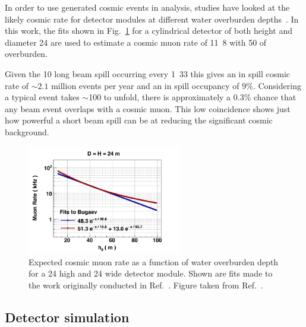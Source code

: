 In order to use generated cosmic events in analysis, studies have looked at the likely cosmic rate
for \chips detector modules at different water overburden depths~\cite{son2013}. In this work, the
fits shown in Fig.~\ref{fig:cosmic_rate} for a cylindrical detector of both height and diameter
\unit{24}{} are used to estimate a \chipsfive cosmic muon rate of
\unit{11.8}{} with \unit{50}{} of overburden.

Given the \unit{10}{\mu{}} long \numi beam spill occurring every \unit{1.33}{}
this gives an in spill cosmic rate of $\sim2.1$ million events per year and an in spill occupancy
of 9\%. Considering a typical event takes $\sim$\unit{100}{} to unfold, there is
approximately a 0.3\% chance that any beam event overlaps with a cosmic muon. This low coincidence
shows just how powerful a short beam spill can be at reducing the significant cosmic background.

\begin{figure} %
    \includegraphics[width=0.6\textwidth]{diagrams/4-chips/cosmic_rate.png}
    \caption[Expected \chipsfive cosmic muon rate as a function of depth.]
    {Expected cosmic muon rate as a function of water overburden depth for a \unit{24}{}
        high and \unit{24}{} wide \chips detector module. Shown are fits made to the
        work originally conducted in Ref.~\cite{bugaev1998}. Figure taken from
        Ref.~\cite{son2013}.}
    \label{fig:cosmic_rate}
\end{figure}

\subsection{Detector simulation} %
\label{sec:chips_monte_carlo_sim} %

